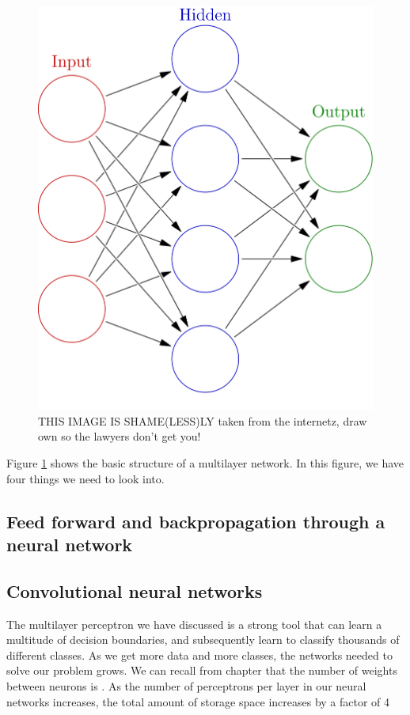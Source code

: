 \begin{figure}[ht!]
\centering
\includegraphics[scale=0.2]{background/figures/neural_network.png}
\caption{THIS IMAGE IS SHAME(LESS)LY taken from the internetz, draw own so the lawyers don't get you!}
\label{fig:mlnn}
\end{figure}

Figure \ref{fig:mlnn} shows the basic structure of a multilayer network.
In this figure, we have four things we need to look into.

\subsection{Feed forward and backpropagation through a neural network}





    
\subsection{Convolutional neural networks}
The multilayer perceptron we have discussed is a strong tool that can learn a multitude of decision boundaries, and subsequently learn to classify thousands of different classes. 
As we get more data and more classes, the networks needed to solve our problem grows. We can recall from chapter  that the number of weights between neurons is . As the number of perceptrons per layer in our neural networks increases, the total amount of storage space increases by a factor of 4 

